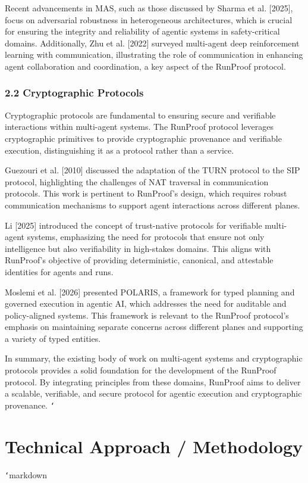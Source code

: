 \documentclass[11pt]{article}
\begin{document}
Recent advancements in MAS, such as those discussed by Sharma et al. [2025], focus on adversarial robustness in heterogeneous architectures, which is crucial for ensuring the integrity and reliability of agentic systems in safety-critical domains. Additionally, Zhu et al. [2022] surveyed multi-agent deep reinforcement learning with communication, illustrating the role of communication in enhancing agent collaboration and coordination, a key aspect of the RunProof protocol.

\subsubsection{2.2 Cryptographic Protocols}

Cryptographic protocols are fundamental to ensuring secure and verifiable interactions within multi-agent systems. The RunProof protocol leverages cryptographic primitives to provide cryptographic provenance and verifiable execution, distinguishing it as a protocol rather than a service.

Guezouri et al. [2010] discussed the adaptation of the TURN protocol to the SIP protocol, highlighting the challenges of NAT traversal in communication protocols. This work is pertinent to RunProof's design, which requires robust communication mechanisms to support agent interactions across different planes.

Li [2025] introduced the concept of trust-native protocols for verifiable multi-agent systems, emphasizing the need for protocols that ensure not only intelligence but also verifiability in high-stakes domains. This aligns with RunProof's objective of providing deterministic, canonical, and attestable identities for agents and runs.

Moslemi et al. [2026] presented POLARIS, a framework for typed planning and governed execution in agentic AI, which addresses the need for auditable and policy-aligned systems. This framework is relevant to the RunProof protocol's emphasis on maintaining separate concerns across different planes and supporting a variety of typed entities.

In summary, the existing body of work on multi-agent systems and cryptographic protocols provides a solid foundation for the development of the RunProof protocol. By integrating principles from these domains, RunProof aims to deliver a scalable, verifiable, and secure protocol for agentic execution and cryptographic provenance.
\texttt{`}

\section{Technical Approach / Methodology}
\texttt{`}markdown
\end{document}
